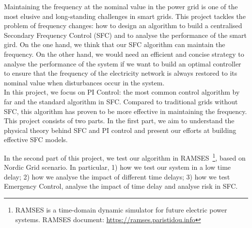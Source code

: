 
Maintaining the frequency at the nominal value in the power grid is one of the most elusive and long-standing challenges in smart grids. This project tackles the problem of frequency changes: how to design an algorithm to build a centralised Secondary Frequency Control (SFC) and to analyse the performance of the smart gird. On the one hand, we think that our SFC algorithm can maintain the frequency. On the other hand, we would need an efficient and concise strategy to analyse the performance of the system if we want to build an optimal controller to ensure that the frequency of the electricity network is always restored to its nominal value when disturbances occur in the system.\\

In this project, we focus on PI Control: the most common control algorithm by far and the standard algorithm in SFC. Compared to traditional grids without SFC, this algorithm has proven to be more effective in maintaining the frequency.\\

This project consists of two parts. In the first part, we aim to understand the physical theory behind SFC and PI control and present our efforts at building effective SFC models. 

In the second part of this project, we test our algorithm in RAMSES~\footnote{RAMSES is a time-domain dynamic simulator for future electric power systems. RAMSES document: \href{https://ramses.paristidou.info}{https://ramses.paristidou.info}}\cite{aristidou2015parallel}, \cite{aristidou2014schur} based on Nordic Grid scenario. In particular, 1) how we test our system in a low time delay; 2) how we analyse the impact of different time delays; 3) how we test Emergency Control, analyse the impact of time delay and analyse risk in SFC. 